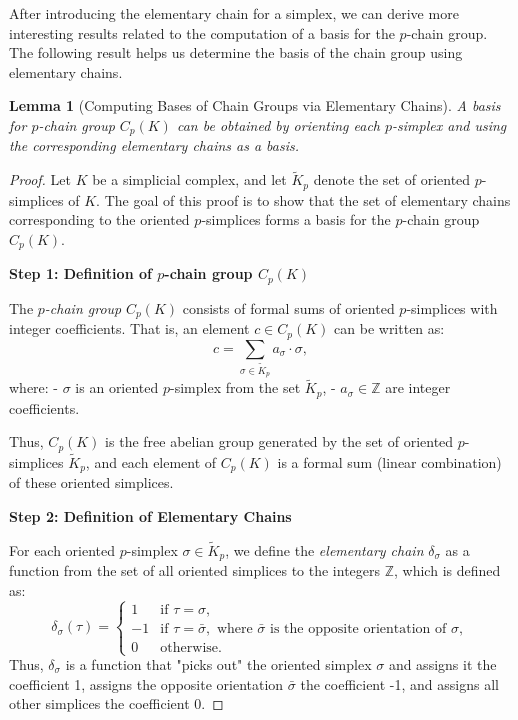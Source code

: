 \documentclass[12pt,oneside,reqno]{amsart}
\theoremstyle{plain}
\newtheorem{lemma}[theorem]{Lemma}
\theoremstyle{definition}
\theoremstyle{remark}
\newcommand{\0}{{\textbf{0}}}
\begin{document}
After introducing the elementary chain for a simplex, we can derive more interesting results related to the computation of a basis for the $p$-chain group. The following result helps us determine the basis of the chain group using elementary chains.

\begin{lemma}[Computing Bases of Chain Groups via Elementary Chains]\label{l:Computing Bases of Chain Groups via Elementary Chains}
A basis for $p$-chain group $C_{p}(K)$ can be obtained by orienting each $p$-simplex and using the corresponding elementary chains as a basis.   
\end{lemma}
\begin{proof}
Let $K$ be a simplicial complex, and let $\widetilde{K}_p$ denote the set of oriented $p$-simplices of $K$. The goal of this proof is to show that the set of elementary chains corresponding to the oriented $p$-simplices forms a basis for the $p$-chain group $C_p(K)$.

\textbf{Step 1: Definition of $p$-chain group $C_p(K)$}

The \textit{$p$-chain group} $C_p(K)$ consists of formal sums of oriented $p$-simplices with integer coefficients. That is, an element $c \in C_p(K)$ can be written as:
\[
c = \sum_{\sigma \in \widetilde{K}_p} a_\sigma \cdot \sigma,
\]
where:
- $\sigma$ is an oriented $p$-simplex from the set $\widetilde{K}_p$,
- $a_\sigma \in \mathbb{Z}$ are integer coefficients.

Thus, $C_p(K)$ is the free abelian group generated by the set of oriented $p$-simplices $\widetilde{K}_p$, and each element of $C_p(K)$ is a formal sum (linear combination) of these oriented simplices.

\textbf{Step 2: Definition of Elementary Chains}

For each oriented $p$-simplex $\sigma \in \widetilde{K}_p$, we define the \textit{elementary chain} $\delta_\sigma$ as a function from the set of all oriented simplices to the integers $\mathbb{Z}$, which is defined as:
\[
\delta_\sigma(\tau) = 
\begin{cases}
1 & \text{if } \tau = \sigma, \\
-1 & \text{if } \tau = \bar{\sigma}, \text{ where } \bar{\sigma} \text{ is the opposite orientation of } \sigma, \\
0 & \text{otherwise}.
\end{cases}
\]
Thus, $\delta_\sigma$ is a function that "picks out" the oriented simplex $\sigma$ and assigns it the coefficient 1, assigns the opposite orientation $\bar{\sigma}$ the coefficient -1, and assigns all other simplices the coefficient 0.


\end{proof}
\end{document}
